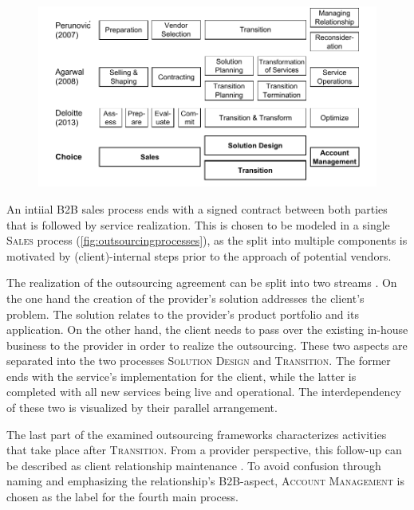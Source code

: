 		\begin{figure}[caption={Outsourcing Process Framework Comparison}, label={fig:outsourcingprocesses}]
		{	\includegraphics[width=.95\textwidth]{figures/outsourcingprocs.pdf}}
	\end{figure} 

	An intiial B2B sales process ends with a signed contract between both parties that is followed by service realization. This is chosen to be modeled in a single \textsc{Sales} process (\cf \Fig \ref{fig:outsourcingprocesses}), as the split into multiple components is motivated by (client)-internal steps prior to the approach of potential vendors. 
	
	The realization of the outsourcing agreement can be split into two streams \citep{Agarwal_2008}. On the one hand the creation of the provider's solution addresses the client's problem. The solution relates to the provider's product portfolio and its application. On the other hand, the client needs to pass over the existing in-house business to the provider in order to realize the outsourcing. These two aspects are separated into the two processes \textsc{Solution Design} and \textsc{Transition}. The former ends with the service's implementation for the client, while the latter is completed with all new services being live and operational. The interdependency of these two is visualized by their parallel arrangement. 
	
	The last part of the examined outsourcing frameworks characterizes activities that take place after \textsc{Transition}. From a provider perspective, this follow-up can be described as client relationship maintenance \citep{Moncrief_2005}. 
	To avoid confusion through naming and emphasizing the relationship's B2B-aspect, \textsc{Account Management} is chosen as the label for the fourth main process.

	
	
